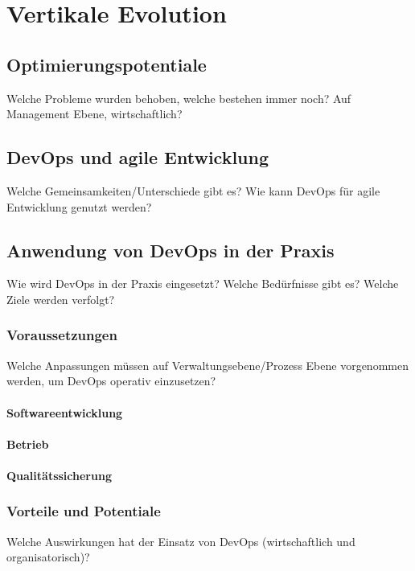 \chapter{Vertikale Evolution} %

\section{Optimierungspotentiale}
Welche Probleme wurden behoben, welche bestehen immer noch?
Auf Management Ebene, wirtschaftlich?

\section{DevOps und agile Entwicklung}
Welche Gemeinsamkeiten/Unterschiede gibt es? Wie kann DevOps für agile Entwicklung genutzt werden?

\section{Anwendung von DevOps in der Praxis}
Wie wird DevOps in der Praxis eingesetzt?
Welche Bedürfnisse gibt es? Welche Ziele werden verfolgt?

\subsection{Voraussetzungen}
Welche Anpassungen müssen auf Verwaltungsebene/Prozess Ebene vorgenommen werden, um DevOps operativ einzusetzen?

\subsubsection{Softwareentwicklung}

\subsubsection{Betrieb}

\subsubsection{Qualitätssicherung}

\subsection{Vorteile und Potentiale}
Welche Auswirkungen hat der Einsatz von DevOps (wirtschaftlich und organisatorisch)?

